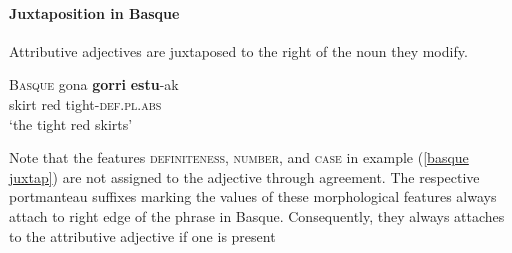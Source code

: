 \paragraph{Juxtaposition in Basque}
Attributive adjectives are juxtaposed to the right of the noun they modify.
\begin{exe}
\ex \textsc{Basque} \citep[81]{saltarelli1988} \label{basque juxtap}
\gll	gona \textbf{gorri} \textbf{estu}-ak\\
	skirt red tight-\textsc{def.pl.abs}\\
\glt	‘the tight red skirts’
\end{exe}
Note that the features \textsc{definiteness, number}, and \textsc{case} in example (\ref{basque juxtap}) are not assigned to the adjective through agreement. The respective portmanteau suffixes marking the values of these morphological features always attach to right edge of the phrase in Basque. Consequently, they always attaches to the attributive adjective if one is present \cite[171]{hualde-etal2003}
